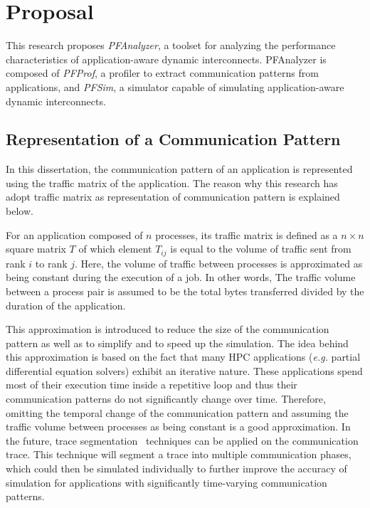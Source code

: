 \section{Proposal}\label{sec:ii-proposal}

This research proposes \emph{PFAnalyzer}, a toolset for analyzing the
performance characteristics of application-aware dynamic interconnects.
PFAnalyzer is composed of \emph{PFProf}, a profiler to extract communication
patterns from applications, and \emph{PFSim}, a simulator capable of
simulating application-aware dynamic interconnects.

\subsection{Representation of a Communication Pattern}

In this dissertation, the communication pattern of an application is
represented using the traffic matrix of the application. The reason why this
research has adopt traffic matrix as representation of communication pattern
is explained below.

For an application composed of \(n\) processes, its traffic matrix is defined
as a \(n \times n\) square matrix \(T\) of which element \(T_{ij}\) is equal
to the volume of traffic sent from rank \(i\) to rank \(j\). Here, the volume
of traffic between processes is approximated as being constant during the
execution of a job. In other words, The traffic volume between a process pair
is assumed to be the total bytes transferred divided by the duration of the
application.

This approximation is introduced to reduce the size of the communication
pattern as well as to simplify and to speed up the simulation. The idea behind
this approximation is based on the fact that many HPC applications
(\emph{e.g.} partial differential equation solvers) exhibit an iterative
nature. These applications spend most of their execution time inside a
repetitive loop and thus their communication patterns do not significantly
change over time. Therefore, omitting the temporal change of the communication
pattern and assuming the traffic volume between processes as being constant is
a good approximation. In the future, trace segmentation~\autocite{Alawneh2016}
techniques can be applied on the communication trace. This technique will
segment a trace into multiple communication phases, which could then be
simulated individually to further improve the accuracy of simulation for
applications with significantly time-varying communication patterns.

